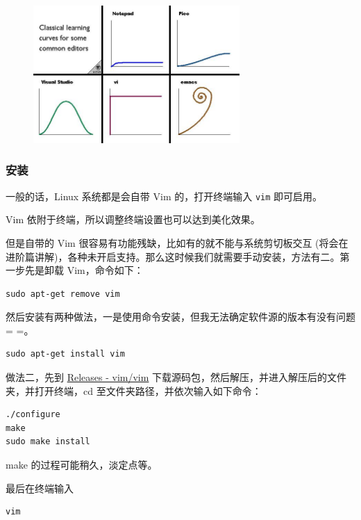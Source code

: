 \begin{figure}[htbp]
\centering
\includegraphics[width=0.7\textwidth]{docs/intro/images/horrorstories.jpg} 

\end{figure}

\subsubsection{安装}

一般的话，Linux 系统都是会自带 Vim 的，打开终端输入 \texttt{vim} 即可启用。

Vim 依附于终端，所以调整终端设置也可以达到美化效果。

但是自带的 Vim 很容易有功能残缺，比如有的就不能与系统剪切板交互 (将会在进阶篇讲解)，各种未开启支持。那么这时候我们就需要手动安装，方法有二。第一步先是卸载 Vim，命令如下：

\begin{verbatim}
sudo apt-get remove vim
\end{verbatim}

然后安装有两种做法，一是使用命令安装，但我无法确定软件源的版本有没有问题 = =。

\begin{verbatim}
sudo apt-get install vim
\end{verbatim}

做法二，先到 \href{https://github.com/vim/vim/releases}{Releases - vim/vim} 下载源码包，然后解压，并进入解压后的文件夹，并打开终端，cd 至文件夹路径，并依次输入如下命令：

\begin{verbatim}
./configure
make
sudo make install
\end{verbatim}

make 的过程可能稍久，淡定点等。

最后在终端输入

\begin{verbatim}
vim
\end{verbatim}

